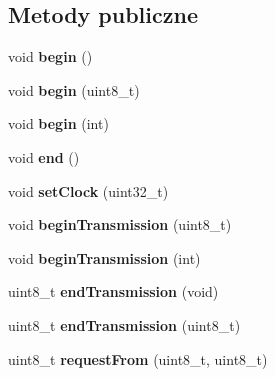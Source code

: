 \subsection*{Metody publiczne}
\begin{DoxyCompactItemize}
\item 
\mbox{\label{class_two_wire_ada85a7a8663ec8af0a1248b659be2f18}} 
void {\bfseries begin} ()
\item 
\mbox{\label{class_two_wire_a28bca087ed188781ef15e72622d3b1fb}} 
void {\bfseries begin} (uint8\+\_\+t)
\item 
\mbox{\label{class_two_wire_a2806aa5684d36d7d20bf7c51cab3e602}} 
void {\bfseries begin} (int)
\item 
\mbox{\label{class_two_wire_a13cca813f6dd0201ac70178b18ba0946}} 
void {\bfseries end} ()
\item 
\mbox{\label{class_two_wire_a3c4aaae8779a8c34d8a1a90ff317d982}} 
void {\bfseries set\+Clock} (uint32\+\_\+t)
\item 
\mbox{\label{class_two_wire_a8d55f00ea8ac3d7427d62e0c71e95ec2}} 
void {\bfseries begin\+Transmission} (uint8\+\_\+t)
\item 
\mbox{\label{class_two_wire_a4da95eb4adced5dad152344243e57aad}} 
void {\bfseries begin\+Transmission} (int)
\item 
\mbox{\label{class_two_wire_af80f9a7b85a3a81a035ca94c95bcdc1d}} 
uint8\+\_\+t {\bfseries end\+Transmission} (void)
\item 
\mbox{\label{class_two_wire_a289f5ef9bb0f79b31095fd72402ed54a}} 
uint8\+\_\+t {\bfseries end\+Transmission} (uint8\+\_\+t)
\item 
\mbox{\label{class_two_wire_ae27d0936487551a05a1e9901bc456599}} 
uint8\+\_\+t {\bfseries request\+From} (uint8\+\_\+t, uint8\+\_\+t)
\item 
\mbox{\label{class_two_wire_a4b4b618531a04d5488a52583a3dfb173}} 

\end{DoxyCompactItemize}

